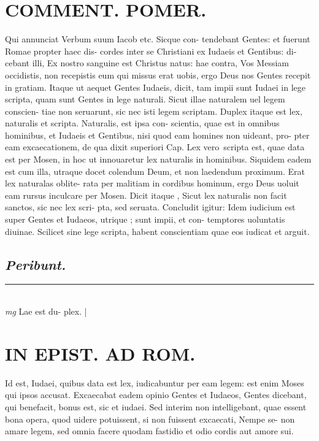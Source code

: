 \documentclass{article}
\begin{document}
\begin{pages}
\section*{COMMENT. POMER.  }\pstart Qui annunciat Verbum suum Iacob etc. Sicque con- tendebant Gentes: et fuerunt Romae propter haec dis- cordes inter se Christiani ex Iudaeis et Gentibus: di- cebant illi, Ex nostro sanguine est Christus natus: hae contra, Vos Messiam occidistis, non recepistis eum qui missus erat uobis, ergo Deus nos Gentes recepit in gratiam. Itaque ut aequet Gentes Iudaeis, dicit, tam impii sunt Iudaei in lege scripta, quam sunt Gentes in lege naturali. Sicut illae naturalem uel legem conscien- tiae non seruarunt, sic nec isti legem scriptam. Duplex itaque est lex, naturalis et scripta. Naturalis, est ipsa con- scientia, quae est in omnibus hominibus, et Iudaeis et Gentibus, nisi quod eam homines non uideant, pro- pter eam excaecationem, de qua dixit superiori Cap.  Lex vero scripta est, quae data est per Mosen, in hoc ut innouaretur lex naturalis in hominibus. Siquidem eadem est cum illa, utraque docet colendum Deum, et non laedendum proximum. Erat lex naturalas oblite- rata per malitiam in cordibus hominum, ergo Deus uoluit eam rursus inculcare per Mosen. Dicit itaque , Sicut lex naturalis non facit sanctos, sic nec lex scri- pta, sed seruata. Concludit igitur: Idem iudicium est super Gentes et Iudaeos, utrique ; sunt impii, et con- temptores uoluntatis diuinae.   \pend\pstart Scilicet sine lege scripta, habent conscientiam quae eos iudicat et arguit.   \pend
{}
{}
\subsection*{\textit{Peribunt. }}
\vspace{0.5cm}\noindent
\vspace{0.2cm}\rule{1cm}{0.2pt}\\ 
\hspace{0.2cm}\textit{mg}
\footnotesize Lae est du- plex.  
\normalsize| 
\section*{IN EPIST. AD ROM.  }
\marginpar{[ p.19 ]}\pstart Id est, Iudaei, quibus data est lex, iudicabuntur per eam legem: est enim Moses qui ipsos accusat.  Excaecabat eadem opinio Gentes et Iudaeos, Gentes dicebant, qui benefacit, bonus est, sic et iudaei. Sed interim non intelligebant, quae essent bona opera, quod uidere potuissent, si non fuissent excaecati, Nempe se- non amare legem, sed omnia facere quodam fastidio et odio cordis aut amore sui.   \pend
{}
{}

\end{pages}
\end{document}
